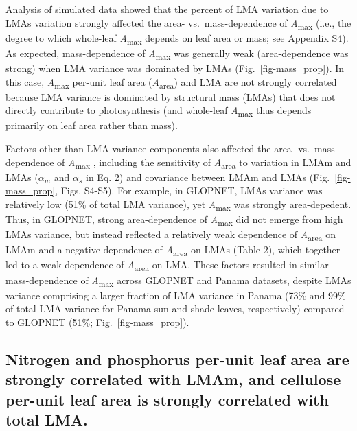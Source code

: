 \documentclass[
  12pt,
  letterpaper,
  DIV=11,
  numbers=noendperiod]{scrartcl}
\begin{document}
Analysis of simulated data showed that the percent of LMA variation due
to LMAs variation strongly affected the area- vs.~mass-dependence of
\emph{A}\textsubscript{max} (i.e., the degree to which whole-leaf
\emph{A}\textsubscript{max} depends on leaf area or mass; see Appendix
S4). As expected, mass-dependence of \emph{A}\textsubscript{max} was
generally weak (area-dependence was strong) when LMA variance was
dominated by LMAs (Fig.~\ref{fig-mass_prop}). In this case,
\emph{A}\textsubscript{max} per-unit leaf area
(\emph{A}\textsubscript{area}) and LMA are not strongly correlated
because LMA variance is dominated by structural mass (LMAs) that does
not directly contribute to photosynthesis (and whole-leaf
\emph{A}\textsubscript{max} thus depends primarily on leaf area rather
than mass).

Factors other than LMA variance components also affected the area-
vs.~mass-dependence of \emph{A}\textsubscript{max} , including the
sensitivity of \emph{A}\textsubscript{area} to variation in LMAm and
LMAs (\(\alpha_m\) and \(\alpha_s\) in Eq. 2) and covariance between
LMAm and LMAs (Fig.~\ref{fig-mass_prop}, Figs. S4-S5). For example, in
GLOPNET, LMAs variance was relatively low (51\% of total LMA variance),
yet \emph{A}\textsubscript{max} was strongly area-depedent. Thus, in
GLOPNET, strong area-dependence of \emph{A}\textsubscript{max} did not
emerge from high LMAs variance, but instead reflected a relatively weak
dependence of \emph{A}\textsubscript{area} on LMAm and a negative
dependence of \emph{A}\textsubscript{area} on LMAs (Table 2), which
together led to a weak dependence of \emph{A}\textsubscript{area} on
LMA. These factors resulted in similar mass-dependence of
\emph{A}\textsubscript{max} across GLOPNET and Panama datasets, despite
LMAs variance comprising a larger fraction of LMA variance in Panama
(73\% and 99\% of total LMA variance for Panama sun and shade leaves,
respectively) compared to GLOPNET (51\%; Fig.~\ref{fig-mass_prop}).

\subsection{Nitrogen and phosphorus per-unit leaf area are strongly
correlated with LMAm, and cellulose per-unit leaf area is strongly
correlated with total
LMA.}\label{nitrogen-and-phosphorus-per-unit-leaf-area-are-strongly-correlated-with-lmam-and-cellulose-per-unit-leaf-area-is-strongly-correlated-with-total-lma.}
\end{document}
